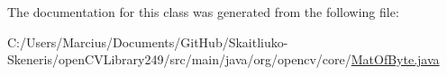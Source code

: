 The documentation for this class was generated from the following file\+:\begin{DoxyCompactItemize}
\item 
C\+:/\+Users/\+Marcius/\+Documents/\+Git\+Hub/\+Skaitliuko-\/\+Skeneris/open\+C\+V\+Library249/src/main/java/org/opencv/core/\mbox{\hyperlink{_mat_of_byte_8java}{Mat\+Of\+Byte.\+java}}\end{DoxyCompactItemize}
